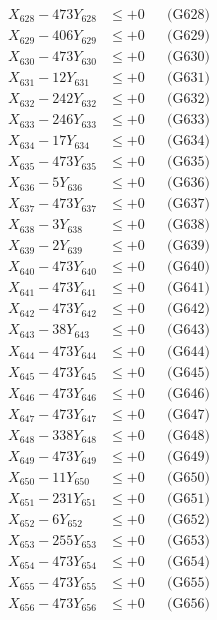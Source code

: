 \documentclass[a4paper,10pt]{article}
\begin{document}
{\begin{align}
X_{628} - 473Y_{628} &\leq +0 && \text{(G628)} \\
X_{629} - 406Y_{629} &\leq +0 && \text{(G629)} \\
X_{630} - 473Y_{630} &\leq +0 && \text{(G630)} \\
\allowbreak
X_{631} - 12Y_{631} &\leq +0 && \text{(G631)} \\
X_{632} - 242Y_{632} &\leq +0 && \text{(G632)} \\
X_{633} - 246Y_{633} &\leq +0 && \text{(G633)} \\
X_{634} - 17Y_{634} &\leq +0 && \text{(G634)} \\
X_{635} - 473Y_{635} &\leq +0 && \text{(G635)} \\
X_{636} - 5Y_{636} &\leq +0 && \text{(G636)} \\
X_{637} - 473Y_{637} &\leq +0 && \text{(G637)} \\
X_{638} - 3Y_{638} &\leq +0 && \text{(G638)} \\
X_{639} - 2Y_{639} &\leq +0 && \text{(G639)} \\
X_{640} - 473Y_{640} &\leq +0 && \text{(G640)} \\
\allowbreak
X_{641} - 473Y_{641} &\leq +0 && \text{(G641)} \\
X_{642} - 473Y_{642} &\leq +0 && \text{(G642)} \\
X_{643} - 38Y_{643} &\leq +0 && \text{(G643)} \\
X_{644} - 473Y_{644} &\leq +0 && \text{(G644)} \\
X_{645} - 473Y_{645} &\leq +0 && \text{(G645)} \\
X_{646} - 473Y_{646} &\leq +0 && \text{(G646)} \\
X_{647} - 473Y_{647} &\leq +0 && \text{(G647)} \\
X_{648} - 338Y_{648} &\leq +0 && \text{(G648)} \\
X_{649} - 473Y_{649} &\leq +0 && \text{(G649)} \\
X_{650} - 11Y_{650} &\leq +0 && \text{(G650)} \\
\allowbreak
X_{651} - 231Y_{651} &\leq +0 && \text{(G651)} \\
X_{652} - 6Y_{652} &\leq +0 && \text{(G652)} \\
X_{653} - 255Y_{653} &\leq +0 && \text{(G653)} \\
X_{654} - 473Y_{654} &\leq +0 && \text{(G654)} \\
X_{655} - 473Y_{655} &\leq +0 && \text{(G655)} \\
X_{656} - 473Y_{656} &\leq +0 && \text{(G656)} \\

\end{align}}
\end{document}
